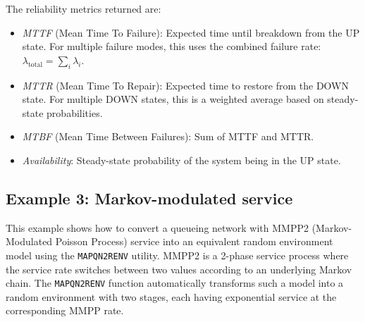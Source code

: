 The reliability metrics returned are:
\begin{itemize}
\item \textit{MTTF} (Mean Time To Failure): Expected time until breakdown from the UP state. For multiple failure modes, this uses the combined failure rate: $\lambda_{\text{total}} = \sum_i \lambda_i$.
\item \textit{MTTR} (Mean Time To Repair): Expected time to restore from the DOWN state. For multiple DOWN states, this is a weighted average based on steady-state probabilities.
\item \textit{MTBF} (Mean Time Between Failures): Sum of MTTF and MTTR.
\item \textit{Availability}: Steady-state probability of the system being in the UP state.
\end{itemize}

\subsection{Example 3: Markov-modulated service}
\label{example-3-MAPQN2RENV}

This example shows how to convert a queueing network with MMPP2 (Markov-Modulated Poisson Process) service into an equivalent random environment model using the \texttt{MAPQN2RENV} utility. MMPP2 is a 2-phase service process where the service rate switches between two values according to an underlying Markov chain. The \texttt{MAPQN2RENV} function automatically transforms such a model into a random environment with two stages, each having exponential service at the corresponding MMPP rate.

